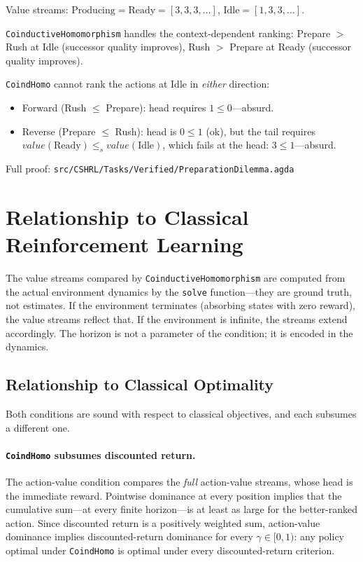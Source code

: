 \documentclass[runningheads]{llncs}
\newcommand{\fpath}[1]{\nolinkurl{#1}}
\begin{document}
Value streams: $\text{Producing} = \text{Ready} = [3,3,3,\ldots]$, $\text{Idle} = [1,3,3,\ldots]$.

\texttt{CoinductiveHomomorphism} handles the context-dependent ranking: Prepare $>$ Rush at Idle (successor quality improves), Rush $>$ Prepare at Ready (successor quality improves).

\texttt{CoindHomo} cannot rank the actions at Idle in \emph{either} direction:
\begin{itemize}
\item Forward (Rush $\le$ Prepare): head requires $1 \le 0$---absurd.
\item Reverse (Prepare $\le$ Rush): head is $0 \le 1$ (ok), but the tail requires $\mathit{value}(\text{Ready}) \le_s \mathit{value}(\text{Idle})$, which fails at the head: $3 \le 1$---absurd.
\end{itemize}

Full proof: \fpath{src/CSHRL/Tasks/Verified/PreparationDilemma.agda}


\section{Relationship to Classical Reinforcement Learning}\label{sec:subsumes}

The value streams compared by \texttt{CoinductiveHomomorphism} are computed from the actual environment dynamics by the \texttt{solve} function---they are ground truth, not estimates.  If the environment terminates (absorbing states with zero reward), the value streams reflect that.  If the environment is infinite, the streams extend accordingly.  The horizon is not a parameter of the condition; it is encoded in the dynamics.

\subsection{Relationship to Classical Optimality}

Both conditions are sound with respect to classical objectives, and each subsumes a different one.

\paragraph{\texttt{CoindHomo} subsumes discounted return.}  The action-value condition compares the \emph{full} action-value streams, whose head is the immediate reward.  Pointwise dominance at every position implies that the cumulative sum---at every finite horizon---is at least as large for the better-ranked action.  Since discounted return is a positively weighted sum, action-value dominance implies discounted-return dominance for every $\gamma \in [0,1)$: any policy optimal under \texttt{CoindHomo} is optimal under every discounted-return criterion.
\end{document}
